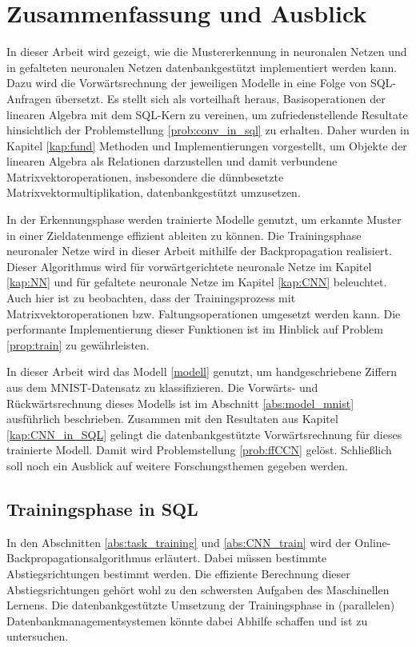 \chapter{Zusammenfassung und Ausblick}
\label{kap:sum}

In dieser Arbeit wird gezeigt, wie die Mustererkennung in neuronalen Netzen und in gefalteten neuronalen Netzen datenbankgestützt implementiert werden kann. Dazu wird die Vorwärtsrechnung der jeweiligen Modelle in eine Folge von SQL-Anfragen übersetzt. Es stellt sich als vorteilhaft heraus, Basisoperationen der linearen Algebra mit dem SQL-Kern zu vereinen, um zufriedenstellende Resultate hinsichtlich der Problemstellung \ref{prob:conv_in_sql} zu erhalten. Daher wurden in Kapitel \ref{kap:fund} Methoden und Implementierungen vorgestellt, um Objekte der linearen Algebra als Relationen darzustellen und damit verbundene Matrixvektoroperationen, insbesondere die dünnbesetzte Matrixvektormultiplikation, datenbankgestützt umzusetzen.

In der Erkennungsphase werden trainierte Modelle genutzt, um erkannte Muster in einer Zieldatenmenge effizient ableiten zu können. Die Trainingsphase neuronaler Netze wird in dieser Arbeit mithilfe der Backpropagation realisiert. Dieser Algorithmus wird für vorwärtgerichtete neuronale Netze im Kapitel \ref{kap:NN} und für gefaltete neuronale Netze im Kapitel \ref{kap:CNN} beleuchtet. Auch hier ist zu beobachten, dass der Trainingsprozess mit Matrixvektoroperationen bzw. Faltungsoperationen umgesetzt werden kann. Die performante Implementierung dieser Funktionen ist im Hinblick auf Problem \ref{prop:train} zu gewährleisten. 

In dieser Arbeit wird das Modell \ref{modell} genutzt, um handgeschriebene Ziffern aus dem MNIST-Datensatz zu klassifizieren. Die Vorwärts- und Rückwärtsrechnung dieses Modells ist im Abschnitt \ref{abs:model_mnist} ausführlich beschrieben. Zusammen mit den Resultaten aus Kapitel \ref{kap:CNN_in_SQL} gelingt die datenbankgestützte Vorwärtsrechnung für dieses trainierte Modell. Damit wird Problemstellung \ref{prob:ffCCN} gelöst. Schließlich soll noch ein Ausblick auf weitere Forschungsthemen gegeben werden.

\section*{Trainingsphase in SQL}
In den Abschnitten \ref{abs:task_training} und \ref{abs:CNN_train} wird der Online-Backpropagationsalgorithmus erläutert. Dabei müssen bestimmte Abstiegsrichtungen bestimmt werden. Die effiziente Berechnung dieser Abstiegsrichtungen gehört wohl zu den schwersten Aufgaben des Maschinellen Lernens. Die datenbankgestützte Umsetzung der Trainingsphase in (parallelen) Datenbankmanagementsystemen könnte dabei Abhilfe schaffen und ist zu untersuchen. 

